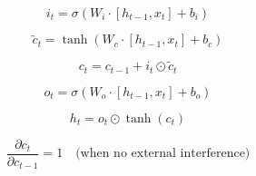 
\begin{equation}
i_t = \sigma\left( W_i \cdot [h_{t-1}, x_t] + b_i \right)
\end{equation}

\begin{equation}
\tilde{c}_t = \tanh\left( W_c \cdot [h_{t-1}, x_t] + b_c \right)
\end{equation}

\begin{equation}
c_t = c_{t-1} + i_t \odot \tilde{c}_t
\end{equation}

\begin{equation}
o_t = \sigma\left( W_o \cdot [h_{t-1}, x_t] + b_o \right)
\end{equation}

\begin{equation}
h_t = o_t \odot \tanh(c_t)
\end{equation}

\begin{equation}
\frac{\partial c_t}{\partial c_{t-1}} = 1 \quad \text{(when no external interference)}
\end{equation}
